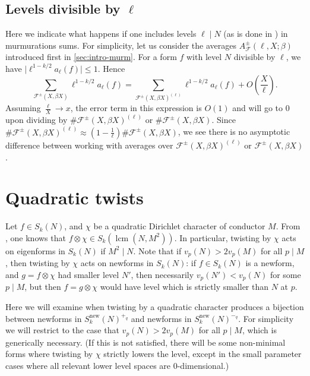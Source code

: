 \documentclass[11pt]{amsart}
\newcommand{\new}{\mathrm{new}}
\DeclareMathOperator{\lcm}{lcm}
\numberwithin{lem}{section}
\theoremstyle{remark}
\theoremstyle{definition}
\numberwithin{equation}{section}
\begin{document}

\subsection{Levels divisible by $\ell$} \label{sec:lmidN}
Here we indicate what happens if one includes levels $\ell \mid N$ (as is done in \cite{zubrilina}) in murmurations sums.  For simplicity, let us consider the averages $A^{\pm}_{\mathcal F}(\ell, X; \beta)$ introduced first in \cref{sec:intro-murm}.  For a form $f$ with level $N$ divisible by $\ell$, we have $\lvert \ell^{1-k/2} a_\ell(f) \rvert \le 1$.  Hence
\[ \sum_{\mathcal F^{\pm}(X,\beta X)} \ell^{1-k/2} a_\ell(f)
= \sum_{\mathcal F^{\pm}(X,\beta X)^{(\ell)}} \ell^{1-k/2} a_\ell(f) + O(\frac X \ell). \]
Assuming $\frac \ell X \to x$, the error term in this expression is $O(1)$ and will go to $0$ upon dividing by $\# \mathcal F^{\pm}(X,\beta X)^{(\ell)}$ or $\#\mathcal F^{\pm}(X,\beta X)$.  Since $\# \mathcal F^{\pm}(X,\beta X)^{(\ell)} \approx (1 - \frac 1 \ell) \#\mathcal F^{\pm}(X,\beta X)$, we see there is no asymptotic difference between working with averages over $ \mathcal F^{\pm}(X,\beta X)^{(\ell)}$ or $\mathcal F^{\pm}(X,\beta X)$.  


\section{Quadratic twists} \label{sec:quadtw}

Let $f \in S_k(N)$, and $\chi$ be a quadratic Dirichlet character of conductor $M$.  
From \cite[Proposition 3.1]{atkin-li}, one knows that $f \otimes \chi \in S_k(\lcm(N,M^2))$.
In particular, twisting by $\chi$ acts on eigenforms in $S_k(N)$ if $M^2 \mid N$.  
Note that if $v_p(N) > 2 v_p(M)$ for all $p \mid M$, then twisting by $\chi$ acts on newforms in $S_k(N)$: if $f \in S_k(N)$ is a newform, and $g = f \otimes \chi$ had smaller level $N'$, then necessarily $v_p(N') < v_p(N)$ for some $p \mid M$,
but then $f = g \otimes \chi$ would have level which is strictly smaller than $N$ at $p$.

Here we will examine when twisting by a quadratic character produces a bijection between newforms in $S^\new_k(N)^{+_q}$ and newforms in $S_k^\new(N)^{-_q}$.  
For simplicity we will restrict to the case that $v_p(N) > 2 v_p(M)$ for all $p \mid M$, which is generically necessary.  (If this is not satisfied, there will be some non-minimal forms where twisting by $\chi$ strictly lowers the level, except in the small parameter cases where all relevant lower level spaces are 0-dimensional.)
\end{document}
